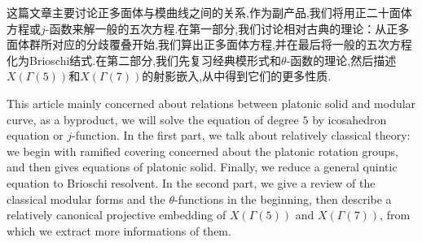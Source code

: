 \begin{cnabstract}
这篇文章主要讨论正多面体与模曲线之间的关系,作为副产品,我们将用正二十面体方程或$j$-函数来解一般的五次方程.在第一部分,我们讨论相对古典的理论：从正多面体群所对应的分歧覆叠开始,我们算出正多面体方程,并在最后将一般的五次方程化为Brioschi结式.在第二部分,我们先复习经典模形式和$\theta$-函数的理论,然后描述$X(\Gamma(5))$和$X(\Gamma(7))$的射影嵌入,从中得到它们的更多性质.

\end{cnabstract}

\begin{enabstract}
This article mainly concerned about relations between platonic solid and modular curve, as a byproduct, we will solve the equation of degree $5$ by icosahedron equation or $j$-function. In the first part, we talk about relatively classical theory: we begin with ramified covering concerned about the platonic rotation groups, and then gives equations of platonic solid. Finally, we reduce a general quintic equation to Brioschi resolvent. In the second part, we give a review of the classical modular forms and the $\theta$-functions in the beginning, then describe a relatively canonical projective embedding of $X(\Gamma(5))$ and $X(\Gamma(7))$, from which we extract more informations of them.
 
\end{enabstract}
